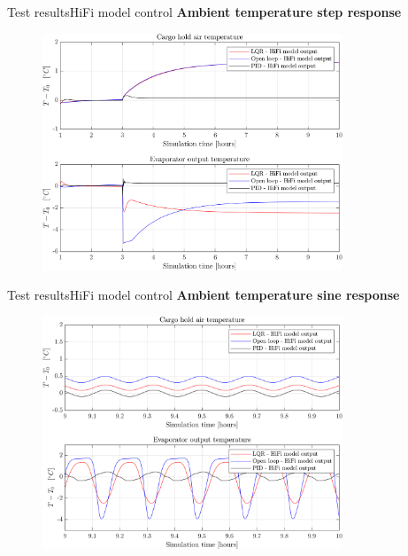 
%
%
%


\begin{frame}{Test results}{HiFi model control}
	\textbf{Ambient temperature step response}
	\begin{figure}[H]
		\centering
		\includegraphics[width=0.8\textwidth]{../Graphics/fig_LQRvsKresten_stepDist_OL_zoom.png}
	\end{figure} 
\end{frame}



\begin{frame}{Test results}{HiFi model control}
	\textbf{Ambient temperature sine response}
	\begin{figure}[H]
		\centering
		\includegraphics[width=0.8\textwidth]{../Graphics/fig_LQRvsKresten_sineDist_OL_zoom.png}
	\end{figure} 
\end{frame}



